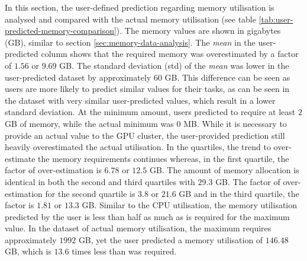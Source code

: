       In this section, the user-defined prediction regarding memory utilisation is analysed and compared with the actual memory utilisation (see table \ref{tab:user-predicted-memory-comparison}).
      The memory values are shown in gigabytes (GB), similar to section \ref{sec:memory-data-analysis}.
      The \emph{mean} in the user-predicted column shows that the required memory was overestimated by a factor of $1.56$ or $9.69$ GB.
      The standard deviation (std) of the \emph{mean} was lower in the user-predicted dataset by approximately $60$ GB.
      This difference can be seen as users are more likely to predict similar values for their tasks, as can be seen in the dataset with very similar user-predicted values, which result in a lower standard deviation.
      At the minimum amount, users predicted to require at least $2$ GB of memory, while the actual minimum was $0$ MB. While it is necessary to provide an actual value to the GPU cluster, the user-provided prediction still heavily overestimated the actual utilisation.
      In the quartiles, the trend to over-estimate the memory requirements continues whereas, in the first quartile, the factor of over-estimation is $6.78$ or $12.5$ GB.
      The amount of memory allocation is identical in both the second and third quartiles with $29.3$ GB.
      The factor of over-estimation for the second quartile is $3.8$ or $21.6$ GB and in the third quartile, the factor is $1.81$ or $13.3$ GB.
      Similar to the CPU utilisation, the memory utilisation predicted by the user is less than half as much as is required for the maximum value. In the dataset of actual memory utilisation, the maximum requires approximately $1992$ GB, yet the user predicted a memory utilisation of $146.48$ GB, which is $13.6$ times less than was required.

